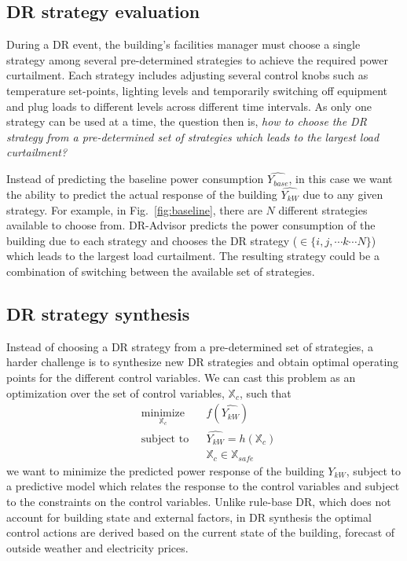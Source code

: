\documentclass{sig-alternate-ipsn13}
\theoremstyle{definition}
\begin{document}
\subsection{DR strategy evaluation}
\label{sec:eval}
During a DR event, the building's facilities manager must choose a single strategy among several pre-determined strategies to achieve the required power curtailment. 
Each strategy includes adjusting several control knobs such as temperature set-points, lighting levels and temporarily switching off equipment and plug loads to different levels across different time intervals. 
As only one strategy can be used at a time, the question then is, \emph{how to choose the DR strategy from a pre-determined set of strategies which leads to the largest load curtailment?}

Instead of predicting the baseline power consumption $\hat{Y_{base}}$, in this case we want the ability to predict the actual response of the building $\hat{Y_{kW}}$ due to any given strategy.
For example, in Fig.~\ref{fig:baseline}, there are $N$ different strategies available to choose from. 
DR-Advisor predicts the power consumption of the building due to each strategy and chooses the DR strategy ($ \in \{i,j, \cdots k \cdots N\}$) which leads to the largest load curtailment.
The resulting strategy could be a combination of switching between the available set of strategies.

\subsection{DR strategy synthesis}
\label{sec:synthesis}
Instead of choosing a DR strategy from a pre-determined set of strategies, a harder challenge is to synthesize new DR strategies and obtain optimal operating points for the different control variables.
We can cast this problem as an optimization over the set of control variables, $\mathbb{X}_c$, such that
\begin{equation}
\begin{aligned}
& \underset{\mathbb{X}_c}{\text{minimize}}
& & f(\hat{Y_{kW}}) \\
& \text{subject to}
& & \hat{Y_{kW}} = h(\mathbb{X}_c) \\
& & & \mathbb{X}_c \in \mathbb{X}_{safe}
\end{aligned}
\label{eq:linear_program}
\end{equation}
we want to minimize the predicted power response of the building $\hat{Y_{kW}}$, subject to a predictive model which relates the response to the control variables and subject to the constraints on the control variables.
Unlike rule-base DR, which does not account for building state and external factors, in DR synthesis the optimal control actions are derived based on the current state of the building, forecast of outside weather and electricity prices.
\end{document}
